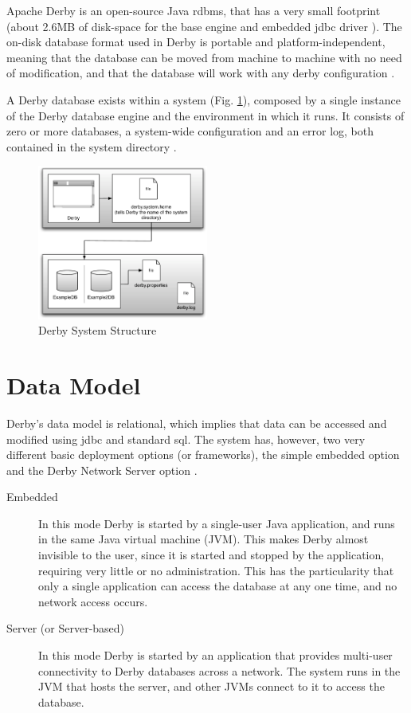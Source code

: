 Apache Derby is an open-source Java \ac{rdbms}, that has a very small footprint (about 2.6MB of disk-space for the base engine and embedded \ac{jdbc} driver \cite{derbySite}). The on-disk database format used in Derby is portable and platform-independent, meaning that the database can be moved from machine to machine with no need of modification, and that the database will work with any derby configuration \cite{derby10}. 

A Derby database exists within a system (Fig. \ref{fig:derbystruct}), composed by a single instance of the Derby database engine and the environment in which it runs. It consists of zero or more databases, a system-wide configuration and an error log, both contained in the system directory \cite{derbyDev10}.

\begin{figure}[htb]
  \begin{center}
    \leavevmode
    \includegraphics[width=0.5\textwidth]{images/derbystruct}
  \end{center}
  \caption{Derby System Structure}
  \label{fig:derbystruct}
\end{figure}

\section{Data Model}
Derby's data model is relational, which implies that data can be accessed and modified using \ac{jdbc} and standard \ac{sql}. The system has, however, two very different basic deployment options (or frameworks), the simple embedded option and the Derby Network Server option \cite{derby10}. 

\begin{description}
	\item[Embedded] In this mode Derby is started by a single-user Java application, and runs in the same Java virtual machine (JVM). This makes Derby almost invisible to the user, since it is started and stopped by the application, requiring very little or no administration. This has the particularity that only a single application can access the database at any one time, and no network access occurs. 
	\item[Server (or Server-based)] In this mode Derby is started by an application that provides multi-user connectivity to Derby databases across a network. The system runs in the JVM that hosts the server, and other JVMs connect to it to access the database.
\end{description}	

